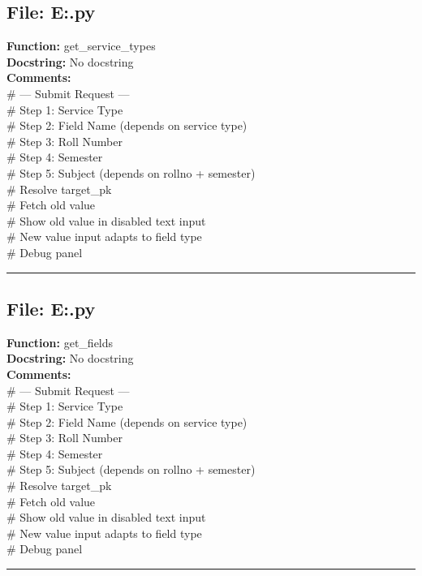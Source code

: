 {\subsection*{File: E:\project\capstone\frontend\faculty\request.py}
\textbf{Function:} get_service_types\\
\textbf{Docstring:} No docstring\\
\textbf{Comments:}\\
# --- Submit Request ---\\
# Step 1: Service Type\\
# Step 2: Field Name (depends on service type)\\
# Step 3: Roll Number\\
# Step 4: Semester\\
# Step 5: Subject (depends on rollno + semester)\\
# Resolve target\_pk\\
# Fetch old value\\
# Show old value in disabled text input\\
# New value input adapts to field type\\
# Debug panel\\

\hrule

\subsection*{File: E:\project\capstone\frontend\faculty\request.py}
\textbf{Function:} get_fields\\
\textbf{Docstring:} No docstring\\
\textbf{Comments:}\\
# --- Submit Request ---\\
# Step 1: Service Type\\
# Step 2: Field Name (depends on service type)\\
# Step 3: Roll Number\\
# Step 4: Semester\\
# Step 5: Subject (depends on rollno + semester)\\
# Resolve target\_pk\\
# Fetch old value\\
# Show old value in disabled text input\\
# New value input adapts to field type\\
# Debug panel\\

\hrule

}
